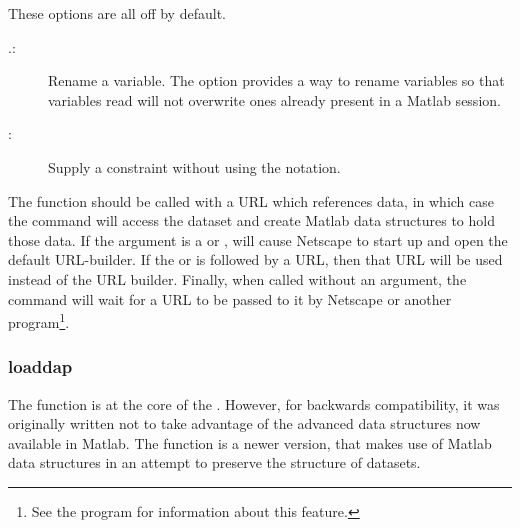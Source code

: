 \begin{description}
\begin{description}

\end{description}

\item[\var{per-url switches}]  These options are all off by default.

\begin{description}

\item[.:] Rename a variable. 
  The  option provides a way to rename variables so that
  variables read will not overwrite ones already present in a Matlab
  session.

\item[:] Supply a constraint without using the
   notation. 

\end{description}


\item[\var{URL}] The  function should be called with a
  \opendap URL which references data, in which case the command will
  access the dataset and create Matlab data structures to hold those
  data.  If the  argument is a \lit{*} or ,
   will cause Netscape to start up and open the default
  \opendap URL-builder.  If the \lit{*} or  is followed by a URL,
  then that URL will be used instead of the URL builder. Finally, when
  called without an argument, the command will wait for a URL to be
  passed to it by Netscape or another program\footnote{See the \opendap
     program for information about this feature.}.

\end{description}

\subsubsection{loaddap}

The  function is at the core of the \GUI.  However, for
backwards compatibility, it was originally written not to take
advantage of the advanced data structures now available in Matlab.
The  function is a newer version, that makes use of
Matlab data structures in an attempt to preserve the structure of
datasets. 

